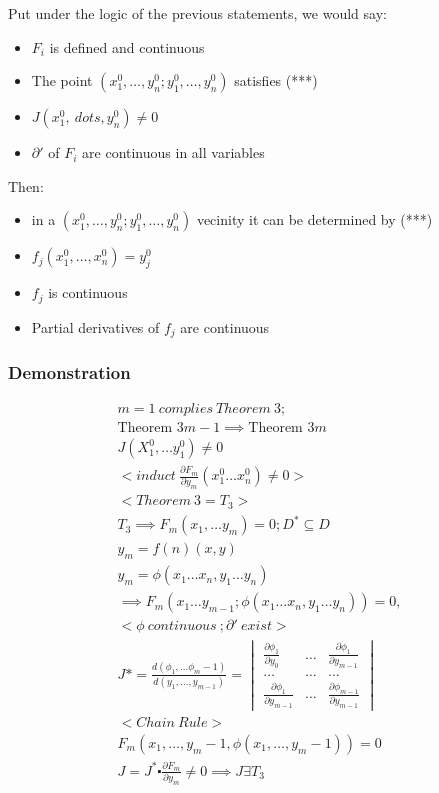 \documentclass[11pt,fleqn]{book} %
\begin{document}
Put under the logic of the previous statements, we would say:

\begin{itemize}
    \item $F_i$ is defined and continuous
    \item The point $(x_1^0, \dots , y_n^0;y_1^0, \dots , y_n^0)$ satisfies (***)
    \item $J(x_1^0, \ dots, y_n^0)\neq 0$ 
    \item $\partial '$ of $F_i$ are continuous in all variables
\end{itemize}

Then:

\begin{itemize}
    \item in a  $(x_1^0, \dots , y_n^0;y_1^0, \dots , y_n^0)$ vecinity it can be determined by (***)
    \item $f_j (x_1^0, \dots, x_n^0) = y_j^0$
    \item $f_j$ is continuous
    \item Partial derivatives of $f_j$ are continuous
\end{itemize}

\subsubsection*{Demonstration}
\begin{gather}
    m = 1 \ complies \ Theorem \ 3; \\
    \text{Theorem 3} m - 1 \implies \text{Theorem 3} m \\
    J(X_1^0, \dots y_1^0) \neq 0\\
    <induct \ \frac{\partial F_m}{\partial y_m}(x_1^0 \dots x_n^0) \neq 0 > \\
    <Theorem \ 3 = T_3>\\
    T_3 \implies F_m(x_1, \dots y_m) = 0; D^* \subseteq D\\
    y_m = f(n)(x,y)\\
    y_m = \phi (x_1 \dots x_n, y_1 \dots y_n)\\
    \implies F_m(x_1 \dots y_{m-1};\phi (x_1 \dots x_n, y_1 \dots y_n)) = 0, \\
    <\phi \ continuous \ ; \partial ' \ exist>\\
    J* = \frac{d(\phi_1, \dots \phi_m-1)}{d(y_1, \dots, y_{m-1})} = \begin{vmatrix}
        \frac{\partial \phi_1}{\partial y_0} & \dots & \frac{\partial \phi_1}{\partial y_{m-1}}\\
        \dots & \dots & \dots \\
        \frac{\partial \phi_1}{\partial y_{m-1}} & \dots & \frac{\partial \phi_{m-1}}{\partial y_{m-1}}
    \end{vmatrix}\\
    <Chain \ Rule>\\
    F_m(x_1, \dots, y_m-1, \phi (x_1, \dots, y_m-1)) = 0\\
    J = J^* \centerdot \frac{\partial F_m}{\partial y_m} \neq 0 \implies J \exists T_3
\end{gather}
\end{document}
